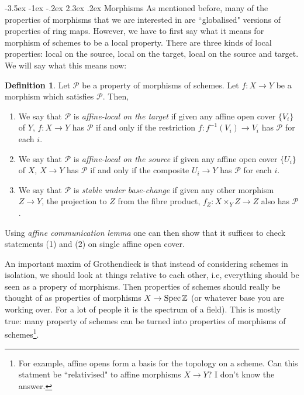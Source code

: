 \documentclass[11pt]{amsart}
\makeatletter
\renewcommand\section{\@startsection {section}{1}{\z@}%
	{-3.5ex \@plus -1ex \@minus -.2ex}%
	{2.3ex \@plus.2ex}%
	{\normalfont\scshape\center}}
\newcommand{\Spec}{{\rm Spec \,}}
\newcommand{\Z}{{\mathbb Z}}
\theoremstyle{definition}
\newtheorem{definition}[theorem]{Definition}
\makeatother
\begin{document}
\section{Morphisms}
As mentioned before, many of the properties of morphisms that we are interested in are ``globalised" versions of properties of ring maps. However, we have to first say what it means for morphism of schemes to be a local property. There are three kinds of local properties: local on the source, local on the target, local on the source and target. We will say what this means now:

\begin{definition}\label{definition-locally-P-morphisms}
	Let $\mathcal{P}$ be a property of morphisms of schemes. Let $f:X\rightarrow Y$ be a morphism which satisfies $\mathcal{P}$. Then,
	\begin{enumerate}
		\item We say that $\mathcal{P}$ is \textit{affine-local on the target} if given any affine open cover $\lbrace V_i\rbrace$ of $Y$, $f:X\rightarrow Y$ has $\mathcal{P}$ if and only if the restriction $f: f^{-1}(V_i)\rightarrow V_i$ has $\mathcal{P}$ for each $i$.
		\item We say that $\mathcal{P}$ is \textit{affine-local on the source} if given any affine open cover $\lbrace U_i\rbrace$ of $X$, $X\rightarrow Y$ has $\mathcal{P}$ if and only if the composite $U_i\rightarrow Y$ has $\mathcal{P}$ for each $i$.
		\item We say that $\mathcal{P}$ is \textit{stable under base-change} if given any other morphism $Z\rightarrow Y$, the projection to $Z$ from the fibre product, $f_Z: X\times_Y Z\rightarrow Z$ also has $\mathcal{P}$.
	\end{enumerate}
\end{definition}

Using \textit{affine communication lemma} one can then show that it suffices to check statements (1) and (2) on single affine open cover.


An important maxim of Grothendieck is that instead of considering schemes in isolation, we should look at things relative to each other, i.e, everything should be seen as a propery of morphisms. Then properties of schemes should really be thought of as properties of morphisms $X\rightarrow\Spec \Z$ (or whatever base you are working over. For a lot of people it is the spectrum of a field). This is mostly true: many property of schemes can be turned into properties of morphisms of schemes\footnote{For example, affine opens form a basis for the topology on a scheme. Can this statment be ``relativised" to affine morphisms $X\rightarrow Y$? I don't know the answer.}.
\end{document}

